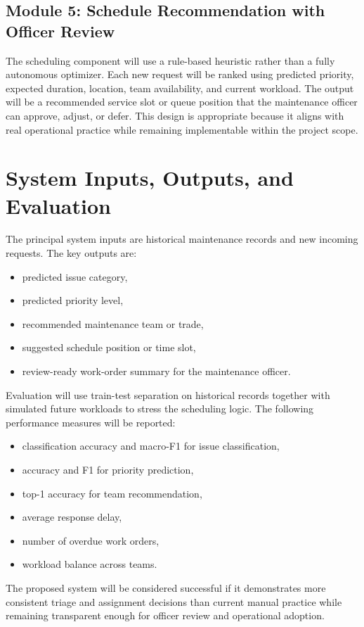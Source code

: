 \documentclass[11pt,a4paper]{report}
\begin{document}
\subsection{Module 5: Schedule Recommendation with Officer Review}
The scheduling component will use a rule-based heuristic rather than a fully autonomous optimizer. Each new request will be ranked using predicted priority, expected duration, location, team availability, and current workload. The output will be a recommended service slot or queue position that the maintenance officer can approve, adjust, or defer. This design is appropriate because it aligns with real operational practice while remaining implementable within the project scope.

\section{System Inputs, Outputs, and Evaluation}
The principal system inputs are historical maintenance records and new incoming requests. The key outputs are:
\begin{itemize}[leftmargin=1.5em]
    \item predicted issue category,
    \item predicted priority level,
    \item recommended maintenance team or trade,
    \item suggested schedule position or time slot,
    \item review-ready work-order summary for the maintenance officer.
\end{itemize}

Evaluation will use train-test separation on historical records together with simulated future workloads to stress the scheduling logic. The following performance measures will be reported:
\begin{itemize}[leftmargin=1.5em]
    \item classification accuracy and macro-F1 for issue classification,
    \item accuracy and F1 for priority prediction,
    \item top-1 accuracy for team recommendation,
    \item average response delay,
    \item number of overdue work orders,
    \item workload balance across teams.
\end{itemize}

The proposed system will be considered successful if it demonstrates more consistent triage and assignment decisions than current manual practice while remaining transparent enough for officer review and operational adoption.
\end{document}
